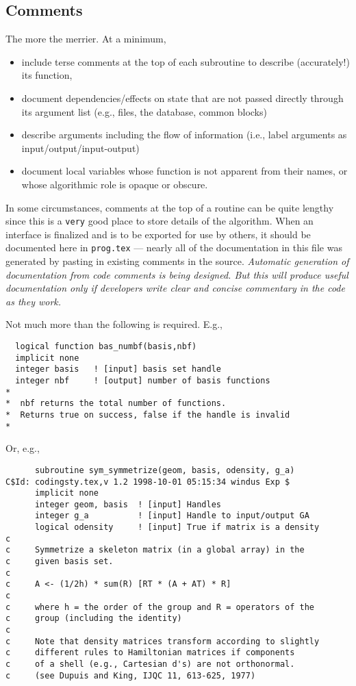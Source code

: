 \subsection{Comments}

The more the merrier.  At a minimum, 
\begin{itemize}
\item include terse comments at the top of each subroutine to describe
  (accurately!) its function,
\item document dependencies/effects on state that are not passed
  directly through its argument list (e.g., files, the database, common
  blocks)
\item describe arguments including the flow of information (i.e.,
  label arguments as input/output/input-output)
\item document local variables whose function is not apparent
  from their names, or whose algorithmic role is opaque or obscure.
\end{itemize}

In some circumstances, comments at the top of a routine can be quite
lengthy since this is a {\tt very} good place to store details of the
algorithm.
When an interface is finalized and is to be exported for use by others,
it should be documented here in {\tt prog.tex} --- nearly all of the
documentation in this file was generated by pasting in existing 
comments in the source.  {\em Automatic generation of documentation
  from code comments is being designed. But this will produce useful documentation
only if
developers write clear and concise commentary in the code as they work.}

Not much more than the following is required.  E.g., 
\begin{verbatim}
  logical function bas_numbf(basis,nbf)
  implicit none
  integer basis   ! [input] basis set handle         
  integer nbf     ! [output] number of basis functions
*
*  nbf returns the total number of functions.
*  Returns true on success, false if the handle is invalid
*  
\end{verbatim}

Or, e.g.,
\begin{verbatim}
      subroutine sym_symmetrize(geom, basis, odensity, g_a)
C$Id: codingsty.tex,v 1.2 1998-10-01 05:15:34 windus Exp $
      implicit none
      integer geom, basis  ! [input] Handles
      integer g_a          ! [input] Handle to input/output GA
      logical odensity     ! [input] True if matrix is a density
c
c     Symmetrize a skeleton matrix (in a global array) in the
c     given basis set.
c
c     A <- (1/2h) * sum(R) [RT * (A + AT) * R]
c
c     where h = the order of the group and R = operators of the
c     group (including the identity)
c
c     Note that density matrices transform according to slightly
c     different rules to Hamiltonian matrices if components
c     of a shell (e.g., Cartesian d's) are not orthonormal.
c     (see Dupuis and King, IJQC 11, 613-625, 1977)
\end{verbatim}

